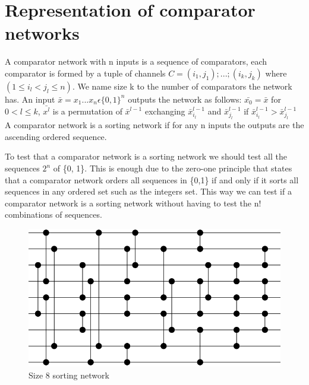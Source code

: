 \documentclass[../main.tex]{subfiles}
\begin{document}
	\section{Representation of comparator networks}
	A comparator network with n inputs is a sequence of comparators, each comparator is formed by a tuple of channels $C=(i_1,j_1);...;(i_k,j_k)$ where $(1 \leq i_l < j_l \leq n)$. We name size k to the number of comparators the network has. An input $\bar{x}=x_1...x_n \epsilon \{0, 1\}^n$ outputs the network as follows: $\bar{x_0}=\bar{x}$ for $0<l\leq k$, $\bar{x^l}$ is a permutation of $\bar x^{l-1}$ exchanging $\bar x^{l-1}_{i_l}$ and $\bar x^{l-1}_{j_l}$ if $\bar x^{l-1}_{i_l} > \bar x^{l-1}_{j_l}$
	A comparator network is a sorting network if for any n inputs the outputs are the ascending ordered sequence. 
	
	To test that a comparator network is a sorting network we should test all the sequences $2^n$ of \{0, 1\}. This is enough due to the zero-one principle\cite{knuth1997art} that states that a comparator network orders all sequences in \{0,1\} if and only if it sorts all sequences in any ordered set such as the integers set. This way we can test if a comparator network is a sorting network without having to test the n! combinations of sequences.
	
	\begin{figure}[H]
		\centering
		\includegraphics[scale=0.8]{images/Size8SortingNetwork}
		\caption{Size 8 sorting network}
		\label{fig:images/Size8SortingNetwork}
	\end{figure}
\end{document}
